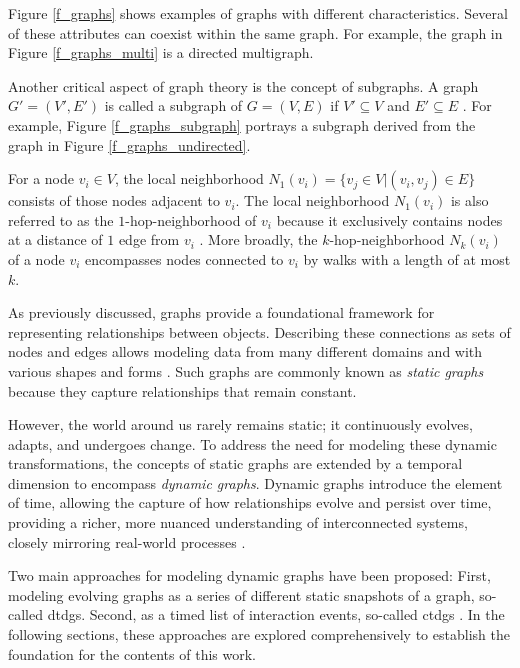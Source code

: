 Figure \ref{f_graphs} shows examples of graphs with different characteristics. Several of these attributes can coexist within the same graph. For example, the graph in Figure \ref{f_graphs_multi} is a directed multigraph.

Another critical aspect of graph theory is the concept of subgraphs. A graph $G' = (V', E')$ is called a subgraph of $G = (V,E)$ if $V' \subseteq V$ and $E' \subseteq E$ \cite{diestel_graph_2017}. For example, Figure \ref{f_graphs_subgraph} portrays a subgraph derived from the graph in Figure \ref{f_graphs_undirected}. 


For a node $v_i \in V$, the local neighborhood $N_1(v_i) = \{v_j \in V | (v_i, v_j) \in E\}$ \cite{wu_comprehensive_2021} consists of those nodes adjacent to $v_i$. The local neighborhood $N_1(v_i)$ is also referred to as the $1$-hop-neighborhood of $v_i$ because it exclusively contains nodes at a distance of $1$ edge from $v_i$ \cite{bronstein_geometric_2021}. More broadly, the $k$-hop-neighborhood $N_k(v_i)$ of a node $v_i$ encompasses nodes connected to $v_i$ by walks with a length of at most $k$. 


As previously discussed, graphs provide a foundational framework for representing relationships between objects. Describing these connections as sets of nodes and edges allows modeling data from many different domains and with various shapes and forms \cite{bronstein_geometric_2017, kazemi_representation_2019}. Such graphs are commonly known as \textit{static graphs} \cite{kazemi_representation_2019, rossi_temporal_2020, you_roland_2022} because they capture relationships that remain constant. 

However, the world around us rarely remains static; it continuously evolves, adapts, and undergoes change. To address the need for modeling these dynamic transformations, the concepts of static graphs are extended by a temporal dimension to encompass \textit{dynamic graphs}. Dynamic graphs introduce the element of time, allowing the capture of how relationships evolve and persist over time, providing a richer, more nuanced understanding of interconnected systems, closely mirroring real-world processes \cite{you_roland_2022, xu_inductive_2020, trivedi_dyrep_2019}.

Two main approaches for modeling dynamic graphs have been proposed: First, modeling evolving graphs as a series of different static snapshots of a graph, so-called \glspl{dtdg}. Second, as a timed list of interaction events, so-called \glspl{ctdg} \cite{rossi_temporal_2020, trivedi_dyrep_2019}. In the following sections, these approaches are explored comprehensively to establish the foundation for the contents of this work.

